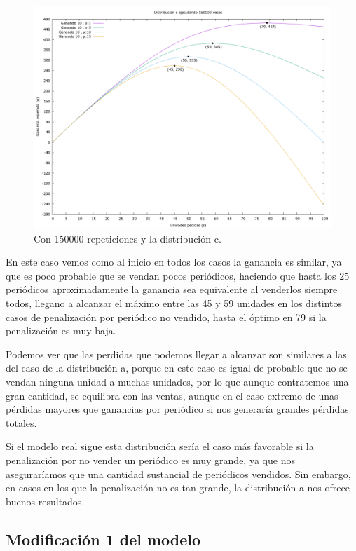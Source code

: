 \documentclass[12pt, spanish]{article}
\begin{document}
\begin{figure}[H]
	\centering
	\includegraphics[scale = 0.2]{prob_c/datos_c_150000.png}
	\caption{Con 150000 repeticiones y la distribución c.}
	\label{fig:ej1_a_150000}

\end{figure}


En este caso vemos como al inicio en todos los casos la ganancia es similar, ya que es poco probable que se vendan pocos periódicos, haciendo que hasta los 25 periódicos aproximadamente la ganancia sea equivalente al venderlos siempre todos, llegano a alcanzar el máximo entre las 45 y 59 unidades en los distintos casos de penalización por periódico no vendido, hasta el óptimo en 79 si la penalización es muy baja.

Podemos ver que las perdidas que podemos llegar a alcanzar son similares a las del caso de la distribución a, porque en este caso es igual de probable que no se vendan ninguna unidad a muchas unidades, por lo que aunque contratemos una gran cantidad, se equilibra con las ventas, aunque en el caso extremo de unas pérdidas mayores que ganancias por periódico si nos generaría grandes pérdidas totales.

Si el modelo real sigue esta distribución sería el caso más favorable si la penalización por no vender un periódico es muy grande, ya que nos aseguraríamos que una cantidad sustancial de periódicos vendidos. Sin embargo, en casos en los que la penalización no es tan grande, la distribución a nos ofrece buenos resultados.

\subsection{Modificación 1 del modelo}
\end{document}
